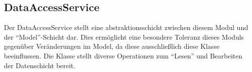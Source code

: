 \subsection{DataAccessService}\label{subsec:dataaccessservice}
Der DataAccessService stellt eine abstraktionsschicht zwischen diesem Modul und
der \enquote{Model}-Schicht dar.
Dies ermöglicht eine besondere Toleranz dieses Moduls gegenüber Veränderungen im Model,
da diese ausschließlich diese Klasse beeinflussen.
Die Klasse stellt diverse Operationen zum \enquote{Lesen} und Bearbeiten der Datenschicht bereit.
